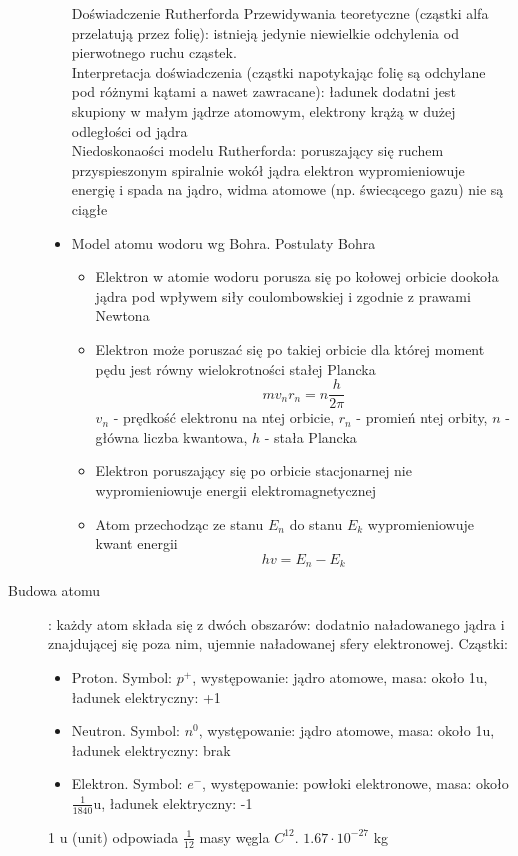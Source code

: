 \documentclass[a4paper,11pt]{article}
\begin{document}
\begin{description}
\begin{itemize}
    Doświadczenie Rutherforda
    Przewidywania teoretyczne (cząstki alfa przelatują przez folię): istnieją jedynie niewielkie odchylenia od pierwotnego ruchu cząstek.\\
    Interpretacja doświadczenia (cząstki napotykając folię są odchylane pod różnymi kątami a nawet zawracane): ładunek dodatni jest skupiony w małym jądrze atomowym, elektrony krążą w dużej odległości od jądra\\
    Niedoskonaości modelu Rutherforda: poruszający się ruchem przyspieszonym spiralnie wokół jądra elektron wypromieniowuje energię i spada na jądro, widma atomowe (np. świecącego gazu) nie są ciągłe
  \item Model atomu wodoru wg Bohra. Postulaty Bohra
    \begin{itemize}
    \item Elektron w atomie wodoru porusza się po kołowej orbicie dookoła jądra pod wpływem siły coulombowskiej i zgodnie z prawami Newtona
    \item Elektron może poruszać się po takiej orbicie dla której moment pędu jest równy wielokrotności stałej Plancka
      $$mv_nr_n=n\frac{h}{2\pi}$$
      $v_n$ - prędkość elektronu na ntej orbicie, $r_n$ - promień ntej orbity, $n$ - główna liczba kwantowa, $h$ - stała Plancka
    \item Elektron poruszający się po orbicie stacjonarnej nie wypromieniowuje energii elektromagnetycznej
    \item Atom przechodząc ze stanu $E_n$ do stanu $E_k$ wypromieniowuje kwant energii
      $$hv = E_n-E_k$$
    \end{itemize}
  \end{itemize}
\item [Budowa atomu]: każdy atom składa się z dwóch obszarów: dodatnio naładowanego jądra i znajdującej się poza nim, ujemnie naładowanej sfery elektronowej.
  Cząstki:
  \begin{itemize}
  \item Proton. Symbol: $p^+$, występowanie: jądro atomowe, masa: około 1u, ładunek elektryczny: +1
  \item Neutron. Symbol: $n^0$, występowanie: jądro atomowe, masa: około 1u, ładunek elektryczny: brak
  \item Elektron. Symbol: $e^-$, występowanie: powłoki elektronowe, masa: około $\frac{1}{1840}$u, ładunek elektryczny: -1
  \end{itemize}
  1 u (unit) odpowiada $\frac{1}{12}$ masy węgla $C^{12}$. $1.67\cdot 10^{-27}$ kg\\

\end{description}
\end{document}
